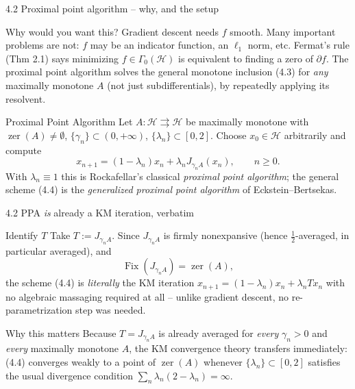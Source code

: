 \documentclass[aspectratio=169,10pt]{beamer}
\newcommand{\Fix}{\operatorname{Fix}}
\newcommand{\zer}{\operatorname{zer}}
\begin{document}
\begin{frame}{4.2 Proximal point algorithm -- why, and the setup}
  \begin{block}{Why would you want this?}
    Gradient descent needs $f$ smooth. Many important problems are not: $f$ may be an indicator function, an $\ell_1$ norm, etc. Fermat's rule (Thm 2.1) says minimizing $f\in\Gamma_0(\mathcal H)$ is equivalent to finding a zero of $\partial f$. The proximal point algorithm solves the general monotone inclusion (4.3) for \emph{any} maximally monotone $A$ (not just subdifferentials), by repeatedly applying its resolvent.
  \end{block}
  \begin{block}{Proximal Point Algorithm}
    Let $A:\mathcal H\rightrightarrows\mathcal H$ be maximally monotone with $\zer(A)\ne\emptyset$, $\{\gamma_n\}\subset(0,+\infty)$, $\{\lambda_n\}\subset[0,2]$. Choose $x_0\in\mathcal H$ arbitrarily and compute
    \begin{equation*}
      x_{n+1} = (1-\lambda_n)x_n + \lambda_n J_{\gamma_n A}(x_n), \qquad n\ge 0. \tag{4.4}
    \end{equation*}
    With $\lambda_n\equiv 1$ this is Rockafellar's classical \emph{proximal point algorithm}; the general scheme (4.4) is the \emph{generalized proximal point algorithm} of Eckstein--Bertsekas.
  \end{block}
\end{frame}

\begin{frame}{4.2 PPA \emph{is} already a KM iteration, verbatim}
  \begin{block}{Identify $T$}
    Take $T:=J_{\gamma_n A}$. Since $J_{\gamma_n A}$ is firmly nonexpansive (hence $\tfrac12$-averaged, in particular averaged), and
    \[
      \Fix(J_{\gamma_n A}) = \zer(A),
    \]
    the scheme (4.4) is \emph{literally} the KM iteration $x_{n+1}=(1-\lambda_n)x_n+\lambda_n T x_n$ with no algebraic massaging required at all -- unlike gradient descent, no re-parametrization step was needed.
  \end{block}
  \begin{block}{Why this matters}
    Because $T=J_{\gamma_n A}$ is already averaged for \emph{every} $\gamma_n>0$ and \emph{every} maximally monotone $A$, the KM convergence theory transfers immediately: (4.4) converges weakly to a point of $\zer(A)$ whenever $\{\lambda_n\}\subset[0,2]$ satisfies the usual divergence condition $\sum_n\lambda_n(2-\lambda_n)=\infty$.
  \end{block}
\end{frame}
\end{document}
